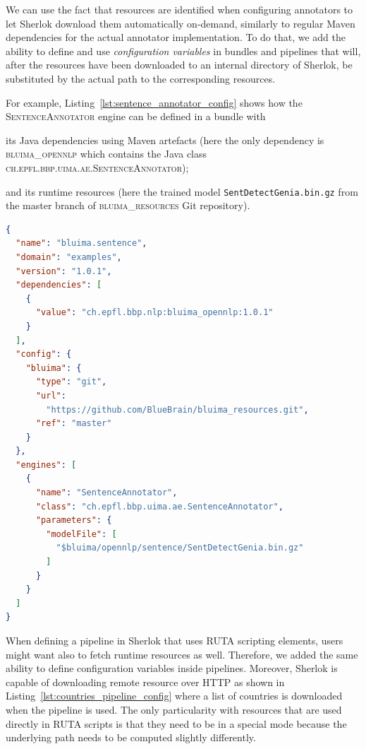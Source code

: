 \documentclass{article}
\newcommand{\ID}[1]{{\textsc{#1}}}
\newcommand{\PATH}[1]{\mbox{\texttt{#1}}}
\begin{document}
We can use the fact that resources are identified when configuring annotators to let Sherlok
download them automatically on-demand, similarly to regular Maven dependencies for the actual
annotator implementation. To do that, we add the ability to define and use \emph{configuration
variables} in bundles and pipelines that will, after the resources have been downloaded to an
internal directory of Sherlok, be substituted by the actual path to the corresponding resources.

For example, Listing~\ref{lst:sentence_annotator_config} shows how the \ID{SentenceAnnotator} engine
can be defined in a bundle with
\begin{enumerate*}[label=\itshape\alph*\upshape)]
    \item its Java dependencies using Maven artefacts (here the only dependency is
        \ID{bluima\_opennlp} which contains the Java class \ID{ch.epfl.bbp.uima.ae.SentenceAnnotator});
    \item and its runtime resources (here the trained model \PATH{SentDetectGenia.bin.gz} from the
        master branch of \ID{bluima\_resources} Git repository).
\end{enumerate*}

\begin{lstlisting}[float,language=json,
                   caption=Configuration of \ID{SentenceAnnotator} in a Sherlok bundle,
                   label=lst:sentence_annotator_config]
{
  "name": "bluima.sentence",
  "domain": "examples",
  "version": "1.0.1",
  "dependencies": [
    {
      "value": "ch.epfl.bbp.nlp:bluima_opennlp:1.0.1"
    }
  ],
  "config": {
    "bluima": {
      "type": "git",
      "url":
        "https://github.com/BlueBrain/bluima_resources.git",
      "ref": "master"
    }
  },
  "engines": [
    {
      "name": "SentenceAnnotator",
      "class": "ch.epfl.bbp.uima.ae.SentenceAnnotator",
      "parameters": {
        "modelFile": [
          "$bluima/opennlp/sentence/SentDetectGenia.bin.gz"
        ]
      }
    }
  ]
}
\end{lstlisting}

When defining a pipeline in Sherlok that uses RUTA scripting elements, users might want also to
fetch runtime resources as well. Therefore, we added the same ability to define configuration
variables inside pipelines. Moreover, Sherlok is capable of downloading remote resource over HTTP as
shown in Listing~\ref{lst:countries_pipeline_config} where a list of countries is downloaded when
the pipeline is used. The only particularity with resources that are used directly in RUTA scripts
is that they need to be in a special mode because the underlying path needs to be computed slightly
differently.
\end{document}

